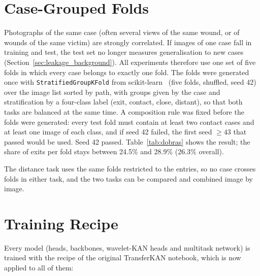 
\section{Case-Grouped Folds}
\label{sec:folds}

Photographs of the same case (often several views of the same wound, or of wounds of the same victim) are strongly correlated. If images of one case fall in training and test, the test set no longer measures generalisation to new cases (Section~\ref{sec:leakage_background}). All experiments therefore use one set of five folds in which every case belongs to exactly one fold. The folds were generated once with \texttt{StratifiedGroupKFold} from scikit-learn~\cite{pedregosa2011scikit} (five folds, shuffled, seed 42) over the image list sorted by path, with groups given by the case and stratification by a four-class label (exit, contact, close, distant), so that both tasks are balanced at the same time. A composition rule was fixed before the folds were generated: every test fold must contain at least two contact cases and at least one image of each class, and if seed 42 failed, the first seed $\geq 43$ that passed would be used. Seed 42 passed. Table~\ref{tab:dobras} shows the result; the share of exits per fold stays between 24.5\% and 28.9\% (26.3\% overall).



The distance task uses the same folds restricted to the entries, so no case crosses folds in either task, and the two tasks can be compared and combined image by image.

\section{Training Recipe}
\label{sec:recipe}

Every model (heads, backbones, wavelet-KAN heads and multitask network) is trained with the recipe of the original TransferKAN notebook, which is now applied to all of them:


